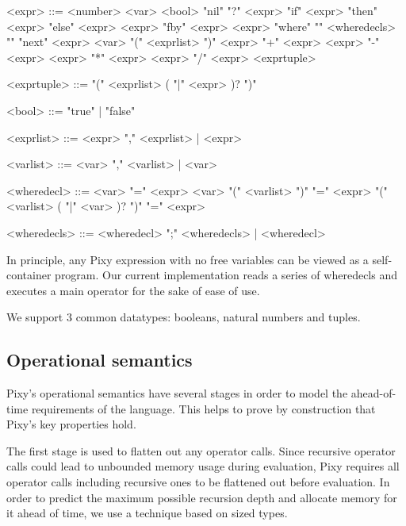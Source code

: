 \documentclass{scrartcl}
\begin{document}
    \begin{grammar}
        <expr> ::= <number>
        \alt <var>
        \alt <bool>
        \alt "nil"
        \alt "?" <expr>
        \alt "if" <expr> "then" <expr> "else" <expr>
        \alt <expr> "fby" <expr>
        \alt <expr> "where" "{" <wheredecls> "}"
        \alt "next" <expr>
        \alt <var> "(" <exprlist> ")"
        \alt <expr> "+" <expr>
        \alt <expr> "-" <expr>
        \alt <expr> "*" <expr>
        \alt <expr> "/" <expr>
        \alt <exprtuple>
        
        <exprtuple> ::= "(" <exprlist> ( "|" <expr> )? ")"
        
        <bool> ::= "true" | "false"
        
        <exprlist> ::= <expr> "," <exprlist> | <expr>
        
        <varlist> ::= <var> "," <varlist> | <var>
        
        <wheredecl> ::= <var> "=" <expr> 
        \alt <var> "(" <varlist> ")" "=" <expr>
        \alt "(" <varlist> ( "|" <var> )? ")" "=" <expr>
        
        <wheredecls> ::= <wheredecl> ";" <wheredecls> | <wheredecl>
    \end{grammar}

    In principle, any Pixy expression with no free variables can be viewed as a self-container program. Our current implementation reads a series of wheredecls and executes a main operator for the sake of ease of use.
    
    We support 3 common datatypes: booleans, natural numbers and tuples.
    
    \subsection{Operational semantics}
    
    Pixy's operational semantics have several stages in order to model the ahead-of-time requirements of the language. This helps to prove by construction that Pixy's key properties hold.
    
    The first stage is used to flatten out any operator calls. Since recursive operator calls could lead to unbounded memory usage during evaluation, Pixy requires all operator calls including recursive ones to be flattened out before evaluation. In order to predict the maximum possible recursion depth and allocate memory for it ahead of time, we use a technique based on sized types.
    
\end{document}
